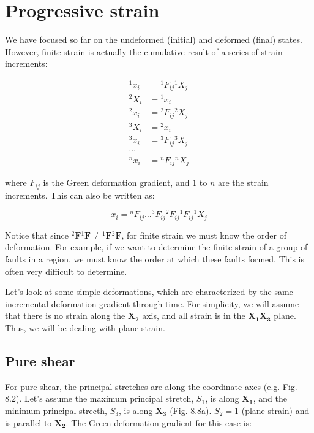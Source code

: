 \documentclass[a4paper , 12pt]{book}
\begin{document}
\section{Progressive strain}

We have focused so far on the undeformed (initial) and deformed (final) states. However, finite strain is actually the cumulative result of a series of strain increments:

\begin{equation}
    \begin{aligned}{ }^{1} x_{i} &={ }^{1} F_{i j}{ }^{1} X_{j} \\{ }^{2} X_{i} &={ }^{1} x_{i} \\{ }^{2} x_{i} &={ }^{2} F_{i j}{ }^{2} X_{j} \\{ }^{3} X_{i} &={ }^{2} x_{i} \\{ }^{3} x_{i} &={ }^{3} F_{i j}{ }^{3} X_{j} \\ \cdots \\{ }^{n} x_{i} &={ }^{n} F_{i j}{ }^{n} X_{j} \end{aligned}
\end{equation}

where $F_{ij}$ is the Green deformation gradient, and $1$ to $n$ are the strain increments. This can also be written as:

\begin{equation}
    x_{i}={ }^{n} F_{i j} \ldots{ }^{3} F_{i j}{ }^{2} F_{i j}{ }^{1} F_{i j}{ }^{1} X_{j}
\end{equation}

Notice that since ${ }^{2}\mathbf{F}{ }^{1}\mathbf{F}\neq{ }^{1}\mathbf{F}{ }^{2}\mathbf{F}$, for finite strain we must know the order of deformation. For example, if we want to determine the finite strain of a group of faults in a region, we must know the order at which these faults formed. This is often very difficult to determine.

Let's look at some simple deformations, which are characterized by the same incremental deformation gradient through time. For simplicity, we will assume that there is no strain along the $\mathbf{X_2}$ axis, and all strain is in the $\mathbf{X_1}\mathbf{X_3}$ plane. Thus, we will be dealing with plane strain.

\subsection{Pure shear}

For pure shear, the principal stretches are along the coordinate axes (e.g. Fig. 8.2). Let's assume the maximum principal stretch, $S_1$, is along $\mathbf{X_1}$, and the minimum principal strecth, $S_3$, is along $\mathbf{X_3}$ (Fig. 8.8a). $S_2 = 1$ (plane strain) and is parallel to $\mathbf{X_2}$. The Green deformation gradient for this case is:
\end{document}

